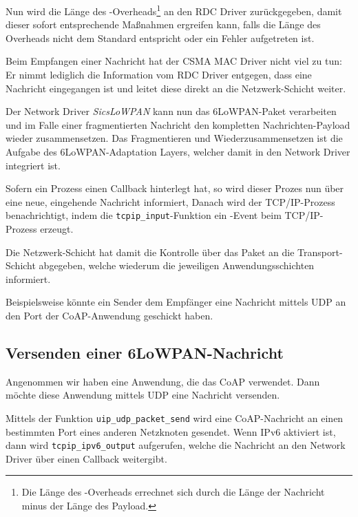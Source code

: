 	Nun wird die Länge des \ieeeframe-Overheads\footnote{Die Länge des
	\ieeeframe-Overheads errechnet sich durch die Länge der Nachricht minus
	der Länge des Payload.} an den RDC Driver zurückgegeben, damit dieser
	sofort entsprechende Maßnahmen ergreifen kann, falls die Länge des
	Overheads nicht dem Standard entspricht oder ein Fehler aufgetreten
	ist.

	Beim Empfangen einer Nachricht hat der CSMA MAC Driver nicht viel zu
	tun: Er nimmt lediglich die Information vom RDC Driver entgegen, dass
	eine Nachricht eingegangen ist und leitet diese direkt an die
	Netzwerk-Schicht weiter.

	Der Network Driver \emph{SicsLoWPAN} kann nun das \acs{6LoWPAN}-Paket
	verarbeiten und im Falle einer fragmentierten Nachricht den kompletten
	Nachrichten-Payload wieder zusammensetzen.  Das Fragmentieren und
	Wiederzusammensetzen ist die Aufgabe des \acs{6LoWPAN}-Adaptation
	Layers, welcher damit in den Network Driver integriert ist.

	Sofern ein Prozess einen Callback hinterlegt hat, so wird dieser Prozes
	nun über eine neue, eingehende Nachricht informiert, Danach wird der
	TCP/IP-Prozess benachrichtigt, indem die \lstinline=tcpip_input=-Funktion
	ein -Event beim TCP/IP-Prozess erzeugt.

	Die Netzwerk-Schicht hat damit die Kontrolle über das Paket an die
	Transport-Schicht abgegeben, welche wiederum die jeweiligen
	Anwendungsschichten informiert.

	Beispielsweise könnte ein Sender dem Empfänger eine Nachricht mittels
	\acs{UDP} an den Port der \acs{CoAP}-Anwendung geschickt haben.


\subsection{Versenden einer 6LoWPAN-Nachricht}

	Angenommen wir haben eine Anwendung, die das \acf{CoAP} verwendet.
	Dann möchte diese Anwendung mittels UDP eine Nachricht versenden.

	Mittels der Funktion \lstinline=uip_udp_packet_send= wird eine
	CoAP-Nachricht an einen bestimmten Port eines anderen Netzknoten
	gesendet.  Wenn IPv6 aktiviert ist, dann wird
	\lstinline=tcpip_ipv6_output= aufgerufen, welche die Nachricht an den
	Network Driver über einen Callback weitergibt.

